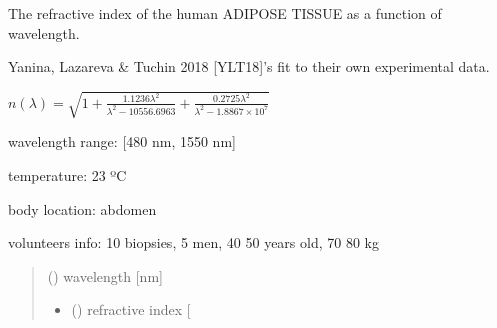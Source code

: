 \documentclass[letterpaper,10pt,english]{sphinxmanual}
\begin{document}
\begin{fulllineitems}
\label{\detokenize{05_refractive_index:skinoptics.refractive_index.n_AT_Yanina}}
\pysigstartsignatures
{}
\pysigstopsignatures
\begin{DUlineblock}{0em}
\item[] The refractive index of the human ADIPOSE TISSUE as a function of wavelength.
\item[] Yanina, Lazareva \& Tuchin 2018 {[}YLT18{]}’s fit to their own experimental data.
\end{DUlineblock}

\sphinxAtStartPar
\(n(\lambda) = \sqrt{1 + \frac{1.1236\lambda^2}{\lambda^2-10556.6963} + \frac{0.2725\lambda^2}{\lambda^2-1.8867\times 10^7}}\)

\begin{DUlineblock}{0em}
\item[] wavelength range: {[}480 nm, 1550 nm{]}
\item[] temperature: 23 ºC
\item[] body location: abdomen
\item[] volunteers info: 10 biopsies, 5 men, 40 \textendash{} 50 years old, 70 \textendash{} 80 kg
\end{DUlineblock}
\begin{quote}\begin{description}
\sphinxAtStartPar
{} () \textendash{} wavelength {[}nm{]}

\sphinxAtStartPar
\begin{itemize}
\item {} 
\sphinxAtStartPar
{} () \textendash{} refractive index {[}\sphinxhyphen{}{]}

\end{itemize}


\end{description}\end{quote}

\end{fulllineitems}

\end{document}
